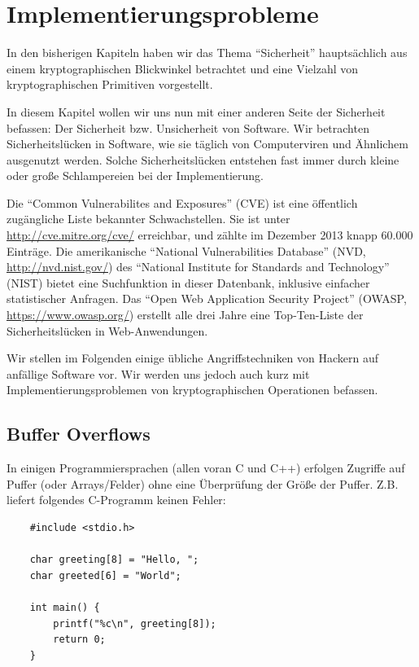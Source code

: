 
\chapter{Implementierungsprobleme}

In den bisherigen Kapiteln haben wir das Thema "`Sicherheit"' hauptsächlich aus einem kryptographischen Blickwinkel betrachtet und eine Vielzahl von kryptographischen Primitiven vorgestellt.

In diesem Kapitel wollen wir uns nun mit einer anderen Seite der Sicherheit befassen: Der Sicherheit bzw. Unsicherheit von Software. Wir betrachten Sicherheitslücken in Software, wie sie täglich von Computerviren und Ähnlichem ausgenutzt werden. Solche Sicherheitslücken entstehen fast immer durch kleine oder große Schlampereien bei der Implementierung.

Die "`Common Vulnerabilites and Exposures"' (CVE) ist eine öffentlich zugängliche Liste bekannter Schwachstellen.
Sie ist unter \url{http://cve.mitre.org/cve/} erreichbar, und zählte im Dezember 2013 knapp 60.000 Einträge.
Die amerikanische "`National Vulnerabilities Database"' (NVD, \url{http://nvd.nist.gov/}) des "`National Institute for Standards and Technology"' (NIST) bietet eine Suchfunktion in dieser Datenbank, inklusive einfacher statistischer Anfragen.
Das "`Open Web Application Security Project"' (OWASP, \url{https://www.owasp.org/}) erstellt alle drei Jahre eine Top-Ten-Liste der Sicherheitslücken in Web-Anwendungen.

Wir stellen im Folgenden einige übliche Angriffstechniken von Hackern auf anfällige Software vor. Wir werden uns jedoch auch kurz mit Implementierungsproblemen von kryptographischen Operationen befassen.

\section{Buffer Overflows}

In einigen Programmiersprachen (allen voran C und C++) erfolgen Zugriffe auf Puffer (oder Arrays/Felder) ohne eine Überprüfung der Größe der Puffer. Z.B. liefert folgendes C-Programm keinen Fehler:


\begin{lstlisting}
	#include <stdio.h>
	
	char greeting[8] = "Hello, ";
	char greeted[6] = "World";
	
	int main() {
		printf("%c\n", greeting[8]);
		return 0;
	}
\end{lstlisting}


